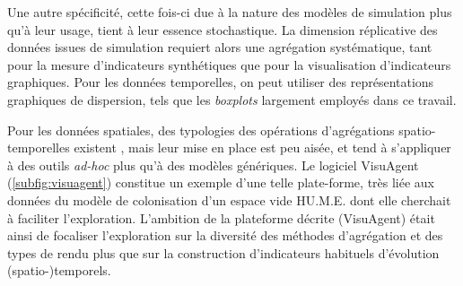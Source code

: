 \noindent Une autre spécificité, cette fois-ci due à la nature des modèles de simulation plus qu'à leur usage, tient à leur essence stochastique.
La dimension réplicative des données issues de simulation requiert alors une agrégation systématique, tant pour la mesure d'indicateurs synthétiques que pour la visualisation d'indicateurs graphiques.
Pour les données temporelles, on peut utiliser des représentations graphiques de dispersion, tels que les \textit{boxplots} largement employés dans ce travail.

\noindent Pour les données spatiales, des typologies des opérations d'agrégations spatio-temporelles existent \autocite{bach_review_2014}, mais leur mise en place est peu aisée, et tend à s'appliquer à des outils \textit{ad-hoc} plus qu'à des modèles génériques.
Le logiciel VisuAgent \autocite{cura_visuagent_2014} (\cref{subfig:visuagent}) constitue un exemple d'une telle plate-forme, très liée aux données du modèle de colonisation d'un espace vide \og HU.M.E.\fg{} \autocite{lenechet:hal-02025441} dont elle cherchait à faciliter l'exploration.
L'ambition de la plateforme décrite (\textsf{VisuAgent}) était ainsi de focaliser l'exploration sur la diversité des méthodes d'agrégation et des types de rendu plus que sur la construction d'indicateurs habituels d'évolution (spatio-)temporels.

